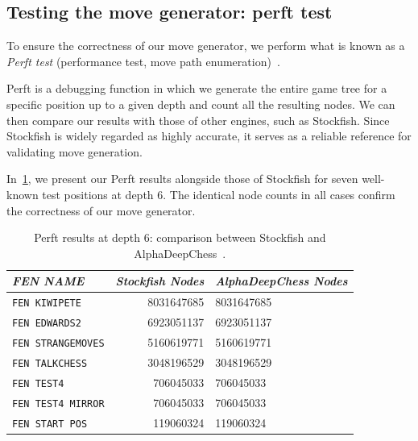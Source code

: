 \subsection*{Testing the move generator: perft test}

To ensure the correctness of our move generator, we perform what is known as a \textit{Perft test} (performance test, move path enumeration)~\cite{Perft}.

\vspace{1em}

\noindent Perft is a debugging function in which we generate the entire game tree for a specific position up to a given depth and count all the resulting nodes. We can then compare our results with those of other engines, such as Stockfish. Since Stockfish is widely regarded as highly accurate, it serves as a reliable reference for validating move generation.

\vspace{1em}

\noindent In~\cref{tab:perftResults}, we present our Perft results alongside those of Stockfish for seven well-known test positions at depth 6. The identical node counts in all cases confirm the correctness of our move generator.

\begin{table}
    \centering
    \begin{tabular}{|l|r|l|}
    \hline
    \textit{FEN NAME} & \textit{Stockfish Nodes} & \textit{AlphaDeepChess Nodes} \\
    \hline
    \texttt{FEN KIWIPETE}       &  8031647685 &  8031647685   \\
    \texttt{FEN EDWARDS2}       &  6923051137 &  6923051137   \\
    \texttt{FEN STRANGEMOVES}   &  5160619771 &  5160619771   \\
    \texttt{FEN TALKCHESS}      &  3048196529 &  3048196529   \\
    \texttt{FEN TEST4}          &  706045033  &  706045033    \\
    \texttt{FEN TEST4 MIRROR}   &  706045033  &  706045033    \\
    \texttt{FEN START POS}      &  119060324  &  119060324    \\
    \hline
    \end{tabular}
    \caption{Perft results at depth 6: comparison between Stockfish and AlphaDeepChess~\cite{PerftResults}.}\label{tab:perftResults}
\end{table}

